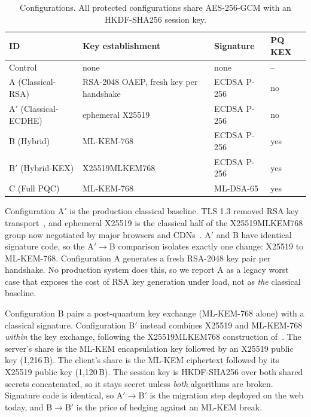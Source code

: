\begin{table}[t]
\centering
\caption{Configurations. All protected configurations share AES-256-GCM with an HKDF-SHA256 session key.}
\label{tab:configs}
\setlength{\tabcolsep}{3pt}
\begin{tabular}{@{}llll@{}}
\toprule
ID & Key establishment & Signature & PQ KEX \\
\midrule
Control & none & none & -- \\
A (Classical-RSA) & RSA-2048 OAEP, fresh key per handshake & ECDSA P-256 & no \\
A$'$ (Classical-ECDHE) & ephemeral X25519 & ECDSA P-256 & no \\
B (Hybrid) & ML-KEM-768 & ECDSA P-256 & yes \\
B$'$ (Hybrid-KEX) & X25519MLKEM768 & ECDSA P-256 & yes \\
C (Full PQC) & ML-KEM-768 & ML-DSA-65 & yes \\
\bottomrule
\end{tabular}
\end{table}

Configuration A$'$ is the production classical baseline. TLS 1.3 removed RSA key
transport~\cite{rfc8446}, and ephemeral X25519 is the classical half of the X25519MLKEM768 group
now negotiated by major browsers and CDNs~\cite{ietf-ecdhe-mlkem}. A$'$ and B have identical
signature code, so the A$'\!\rightarrow$B comparison isolates exactly one change: X25519 to
ML-KEM-768. Configuration A generates a fresh RSA-2048 key pair per handshake. No production
system does this, so we report A as a legacy worst case that exposes the cost of RSA key generation
under load, not as \emph{the} classical baseline.

Configuration B pairs a post-quantum key exchange (ML-KEM-768 alone) with a classical signature.
Configuration B$'$ instead combines X25519 and ML-KEM-768 \emph{within} the key exchange, following
the X25519MLKEM768 construction of~\cite{ietf-ecdhe-mlkem}. The server's share is the ML-KEM
encapsulation key followed by an X25519 public key (1,216\,B). The client's share is the ML-KEM
ciphertext followed by its X25519 public key (1,120\,B). The session key is HKDF-SHA256 over both
shared secrets concatenated, so it stays secret unless \emph{both} algorithms are broken. Signature
code is identical, so A$'\!\rightarrow$B$'$ is the migration step deployed on the web today, and
B$\rightarrow$B$'$ is the price of hedging against an ML-KEM break.

